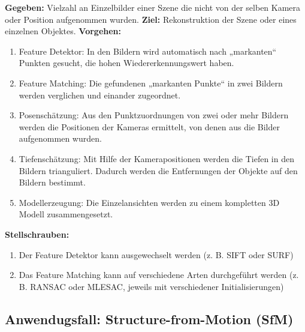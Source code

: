 \textbf{Gegeben:}\newline
Vielzahl an Einzelbilder einer Szene die nicht von der selben Kamera oder Position aufgenommen wurden.\newline
\textbf{Ziel:}\newline
Rekonstruktion der Szene oder eines einzelnen Objektes.\newline
\textbf{Vorgehen:}
\begin{enumerate}
\item Feature Detektor: In den Bildern wird automatisch nach „markanten“ Punkten gesucht, die hohen Wiedererkennungswert haben.\item Feature Matching: Die gefundenen „markanten Punkte“ in zwei Bildern werden verglichen und einander zugeordnet.\item Posenschätzung: Aus den Punktzuordnungen von zwei oder mehr Bildern werden die Positionen der Kameras ermittelt, von denen aus die Bilder aufgenommen wurden.\item Tiefenschätzung: Mit Hilfe der Kamerapositionen werden die Tiefen in den Bildern trianguliert. Dadurch werden die Entfernungen der Objekte auf den Bildern bestimmt.\item Modellerzeugung: Die Einzelansichten werden zu einem kompletten 3D Modell zusammengesetzt.
\end{enumerate}
\textbf{Stellschrauben:}
\begin{enumerate}
\item Der Feature Detektor kann ausgewechselt werden (z. B. SIFT oder SURF)\item Das Feature Matching kann auf verschiedene Arten durchgeführt werden (z. B. RANSAC oder MLESAC, jeweils mit verschiedener Initialisierungen)
\end{enumerate}

 
\subsection{Anwendugsfall: Structure-from-Motion (SfM)}

